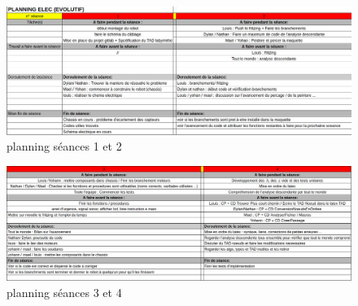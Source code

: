 \begin{figure}[h!]
    \hspace{-2cm}
    \includegraphics[width=1.2\textwidth]{imagesRapport/planning1.png}
    \caption{planning séances 1 et 2}
    \label{fig:exemple}
\end{figure}
\begin{figure}[h!]
    \hspace{-2cm}
    \includegraphics[width=1.2\textwidth]{imagesRapport/planning2.png}
    \caption{planning séances 3 et 4}
    \label{fig:exemple}
\end{figure}
\vspace{5cm}

